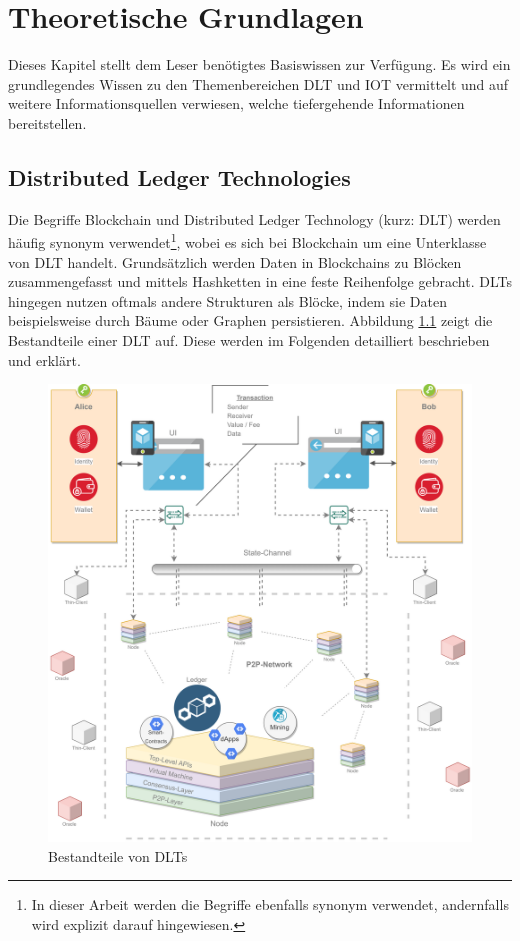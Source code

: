 \chapter{Theoretische Grundlagen}
\label{ch:fundamentals}
Dieses Kapitel stellt dem Leser benötigtes Basiswissen zur Verfügung. Es wird ein grundlegendes Wissen zu den Themenbereichen \ac{DLT} und \ac{IOT} vermittelt und auf weitere Informationsquellen verwiesen, welche tiefergehende Informationen bereitstellen.

%
%
\section{Distributed Ledger Technologies}
\label{sec:fundamentals:dlt}
Die Begriffe Blockchain und Distributed Ledger Technology (kurz: \ac{DLT}) werden häufig synonym verwendet\footnote{In dieser Arbeit werden die Begriffe ebenfalls synonym verwendet, andernfalls wird explizit darauf hingewiesen.}, wobei es sich bei Blockchain um eine Unterklasse von \ac{DLT} handelt. Grundsätzlich werden Daten in Blockchains zu Blöcken zusammengefasst und mittels Hashketten in eine feste Reihenfolge gebracht. \ac{DLT}s hingegen nutzen oftmals andere Strukturen als Blöcke, indem sie Daten beispielsweise durch Bäume oder Graphen persistieren. Abbildung \ref{fig:chapter02:overview-dlt} zeigt die Bestandteile einer \ac{DLT} auf. Diese werden im Folgenden detailliert beschrieben und erklärt.\\

\begin{figure}[h]
 \centering
 \includegraphics[width=1.0\textwidth]{gfx/Overview-DLT.png}
 \caption{Bestandteile von DLTs}
 \label{fig:chapter02:overview-dlt}
\end{figure}

